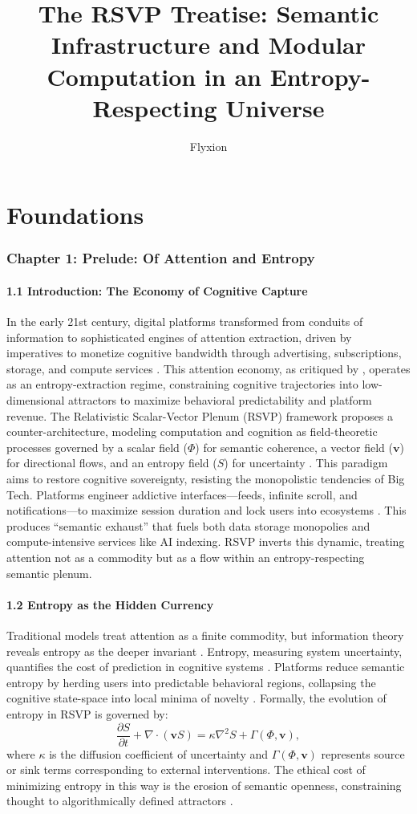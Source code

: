 \documentclass[12pt]{article}
\title{The RSVP Treatise: Semantic Infrastructure and Modular Computation in an Entropy-Respecting Universe}
\author{Flyxion}
\date{}
\begin{document}
\maketitle
\tableofcontents
\part{Foundations}
\section*{Chapter 1: Prelude: Of Attention and Entropy}
\subsection*{1.1 Introduction: The Economy of Cognitive Capture}
In the early 21st century, digital platforms transformed from conduits of information to sophisticated engines of attention extraction, driven by imperatives to monetize cognitive bandwidth through advertising, subscriptions, storage, and compute services \citep{zuboff2019}. This attention economy, as critiqued by \citet{lanier2018}, operates as an entropy-extraction regime, constraining cognitive trajectories into low-dimensional attractors to maximize behavioral predictability and platform revenue.
The Relativistic Scalar-Vector Plenum (RSVP) framework proposes a counter-architecture, modeling computation and cognition as field-theoretic processes governed by a scalar field (\(\Phi\)) for semantic coherence, a vector field (\(\mathbf{v}\)) for directional flows, and an entropy field (\(S\)) for uncertainty \citep{shannon1948, jaynes2003}. This paradigm aims to restore cognitive sovereignty, resisting the monopolistic tendencies of Big Tech. Platforms engineer addictive interfaces---feeds, infinite scroll, and notifications---to maximize session duration and lock users into ecosystems \citep{zuboff2019}. This produces ``semantic exhaust'' that fuels both data storage monopolies and compute-intensive services like AI indexing. RSVP inverts this dynamic, treating attention not as a commodity but as a flow within an entropy-respecting semantic plenum.
\subsection*{1.2 Entropy as the Hidden Currency}
Traditional models treat attention as a finite commodity, but information theory reveals entropy as the deeper invariant \citep{cover2006}. Entropy, measuring system uncertainty, quantifies the cost of prediction in cognitive systems \citep{shannon1948}. Platforms reduce semantic entropy by herding users into predictable behavioral regions, collapsing the cognitive state-space into local minima of novelty \citep{jaynes2003}.
Formally, the evolution of entropy in RSVP is governed by:
\[
\frac{\partial S}{\partial t} + \nabla \cdot (\mathbf{v} S) = \kappa \nabla^2 S + \Gamma(\Phi, \mathbf{v}),
\]
where \(\kappa\) is the diffusion coefficient of uncertainty and \(\Gamma(\Phi, \mathbf{v})\) represents source or sink terms corresponding to external interventions. The ethical cost of minimizing entropy in this way is the erosion of semantic openness, constraining thought to algorithmically defined attractors \citep{deleuze1987}.
\end{document}
